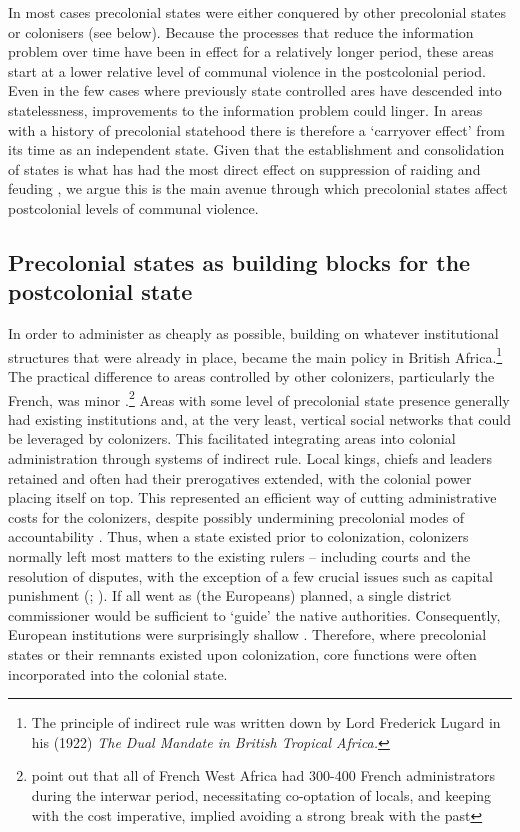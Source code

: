 In most cases precolonial states were either conquered by other precolonial
states or colonisers (see below). Because the processes that reduce the
information problem over time have been in effect for a relatively longer
period, these areas start at a lower relative level of communal violence in the
postcolonial period. Even in the few cases where previously state controlled
ares have descended into statelessness, improvements to the information problem
could linger. In areas with a history of precolonial statehood there is
therefore a `carryover effect' from its time as an independent state. Given that
the establishment and consolidation of states is what has had the most direct
effect on suppression of raiding and feuding \citep{Pinker2012}, we argue this
is the main avenue through which precolonial states affect postcolonial levels
of communal violence.

\subsection{Precolonial states as building blocks for the postcolonial state}
\label{Precolonial states as building blocks for the postcolonial state}

In order to administer as cheaply as possible, building on whatever
institutional structures that were already in place, became the main policy in
British Africa.\footnote{The principle of indirect rule was written down by Lord
	Frederick Lugard in his (1922) \textit{The Dual Mandate in British
	Tropical Africa.}} The practical difference to areas controlled by other
	colonizers, particularly the French, was minor
	\citep{boone2014property}.\footnote{\citet[31]{englebert2013inside}
		point out that all of French West Africa had 300-400 French
		administrators during the interwar period, necessitating
		co-optation of locals, and keeping with the cost imperative,
	implied avoiding a strong break with the past} Areas with some level of
	precolonial state presence generally had existing institutions and, at
	the very least, vertical social networks that could be leveraged by
	colonizers. This facilitated integrating areas into colonial
	administration through systems of indirect rule. Local kings, chiefs and
	leaders retained and often had their prerogatives extended, with the
	colonial power placing itself on top. This represented an efficient way
	of cutting administrative costs for the colonizers, despite possibly
	undermining precolonial modes of accountability
	\citep{mamdani1996citizen}. Thus, when a state existed prior to
	colonization, colonizers normally left most matters to the existing
	rulers -- including courts and the resolution of disputes, with the
	exception of a few crucial issues such as capital punishment
	(\citealp{boone2014property}; \citealp[30]{englebert2013inside}). If all
	went as (the Europeans) planned, a single district commissioner would be
	sufficient to `guide' the native authorities. Consequently, European
	institutions were surprisingly shallow \citep[25]{englebert2013inside}.
	Therefore, where precolonial states or their remnants existed upon
	colonization, core functions were often incorporated into the colonial
	state.

